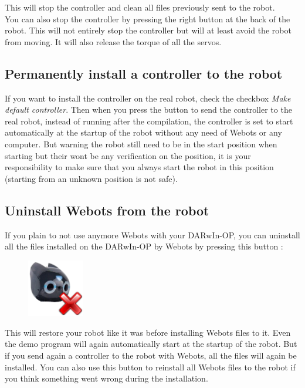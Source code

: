 \documentclass[a4paper, 12pt]{article}  		%
\begin{document}
This will stop the controller and clean all files previously sent to the robot.\\

You can also stop the controller by pressing the right button at the back of the robot. This will not entirely stop the controller but will at least avoid the robot from moving. It will also release the torque of all the servos.\\

\subsection{Permanently install a controller to the robot}
If you want to install the controller on the real robot, check the checkbox \textit{Make default controller}. Then when you press the button to send the controller to the real robot, instead of running after the compilation, the controller is set to start automatically at the startup of the robot without any need of Webots or any computer. But warning the robot still need to be in the start position when starting but their wont be any verification on the position, it is your responsibility to make sure that you always start the robot in this position (starting from an unknown position is not safe).\\

\subsection{Uninstall Webots from the robot}
If you plain to not use anymore Webots with your DARwIn-OP, you can uninstall all the files installed on the DARwIn-OP by Webots by pressing this button :
\begin{figure}[H]
\begin{center}
\includegraphics[width=2.5cm]{uninstall.png}
\label{uninstall}
\end{center}
\end{figure}

This will restore your robot like it was before installing Webots files to it. Even the demo program will again automatically start at the startup of the robot. But if you send again a controller to the robot with Webots, all the files will again be installed. You can also use this button to reinstall all Webots files to the robot if you think something went wrong during the installation.\\ 
\end{document}

